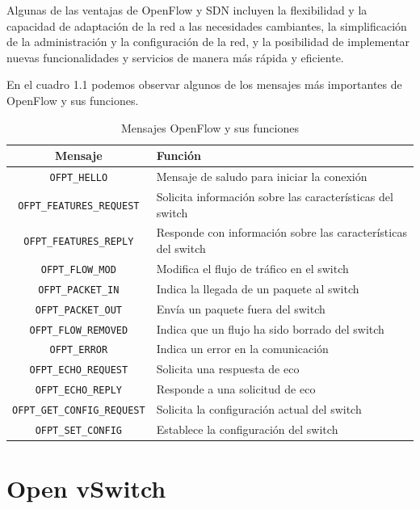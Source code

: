 \documentclass[a4paper, 12pt]{book}
\begin{document}
	
	Algunas de las ventajas de OpenFlow y SDN incluyen la flexibilidad y la capacidad de adaptación de la red a las necesidades cambiantes, la simplificación de la administración y la configuración de la red, y la posibilidad de implementar nuevas funcionalidades y servicios de manera más rápida y eficiente.
	
	En el cuadro 1.1 podemos observar algunos de los mensajes más importantes de  OpenFlow y sus funciones.
	
	\begin{table}[H] %
		\centering
	
	
		\begin{tabular}{|c|l|}
			\hline
			\textbf{Mensaje} & \textbf{Función} \\
			\hline
			\texttt{OFPT\_HELLO} & Mensaje de saludo para iniciar la conexión \\
			\hline
			\texttt{OFPT\_FEATURES\_REQUEST} & Solicita información sobre las características del switch \\
			\hline
			\texttt{OFPT\_FEATURES\_REPLY} & Responde con información sobre las características del switch \\
			\hline
			\texttt{OFPT\_FLOW\_MOD} & Modifica el flujo de tráfico en el switch \\
			\hline
			\texttt{OFPT\_PACKET\_IN} & Indica la llegada de un paquete al switch \\
			\hline
			\texttt{OFPT\_PACKET\_OUT} & Envía un paquete fuera del switch \\
			\hline
			\texttt{OFPT\_FLOW\_REMOVED} & Indica que un flujo ha sido borrado del switch \\
			\hline
			\texttt{OFPT\_ERROR} & Indica un error en la comunicación \\
			\hline
			\texttt{OFPT\_ECHO\_REQUEST} & Solicita una respuesta de eco \\
			\hline
			\texttt{OFPT\_ECHO\_REPLY} & Responde a una solicitud de eco \\
			\hline
			\texttt{OFPT\_GET\_CONFIG\_REQUEST} & Solicita la configuración actual del switch \\
			\hline
			\texttt{OFPT\_SET\_CONFIG} & Establece la configuración del switch \\
			\hline
		\end{tabular}
		\label{tab:openflow}
		\caption{Mensajes OpenFlow y sus funciones}
	\end{table}
	
	\section{Open vSwitch} 
	\label{sec:vswitch}
	
\end{document}
